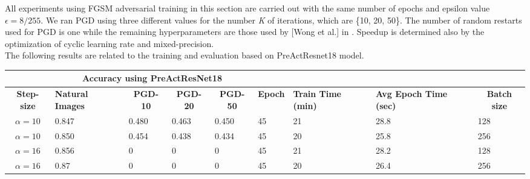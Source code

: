 \documentclass{article}
\begin{document}
All experiments using FGSM adversarial training in this section are carried out
with the same number of epochs and epsilon value $\epsilon = 8/255$. We ran PGD using three different values for the number \textit{K} of iterations,
which are \{10, 20, 50\}. The number of random restarts used for PGD is one
while the remaining hyperparameters are those used by [Wong et al.]
in \cite{WongEtAl2020}. Speedup is determined also by the optimization of cyclic learning rate and
mixed-precision.\\
The following results are related to the training and evaluation based on PreActResnet18 model. 
\begin{center}
\begin{table}[hbt!]
\begin{tabular}{|c|l|l|l|l|l|l|l|l|}
\hline
\multicolumn{1}{|l|}{{ }} & \multicolumn{4}{c|}{{ \textbf{Accuracy using
PreActResNet18}}}
& \multicolumn{4}{l|}{{ }}
\\ \hline
{ \textbf{Step-size}}     & \multicolumn{1}{p{1.5cm}|}{{ \textbf{Natural
Images}}} & \multicolumn{1}{c|}{{ \textbf{PGD-10}}} & \multicolumn{1}{c|}{{
\textbf{PGD-20}}} & \multicolumn{1}{c|}{{ \textbf{PGD-50}}} &
\multicolumn{1}{c|}{{ \textbf{Epoch}}} & \multicolumn{1}{p{1.5cm}|}{{
\textbf{Train Time (min)}}} & \multicolumn{1}{p{1.5cm}|}{{ \textbf{Avg Epoch
Time (sec)}}} & \multicolumn{1}{c|}{{ \textbf{Batch size}}} \\ \hline
{ $\alpha = 10$}       & { 0.847}                                        & {
0.480}                                & { 0.463}
& { 0.450}                                & { 45}
& { 21 }                               & { 28.8 }
& { 128}                                      \\ \hline
{ $\alpha = 10$}       & { 0.850}                                        & {
0.454}                                & { 0.438}
& { 0.434}                                & { 45}
& { 20 }                               & { 25.8 }
& { 256}                                      \\ \hline
{ $\alpha = 16$}       & { 0.856}                                        & { 0}
& { 0}                                    & { 0}
& { 45}                                  & { 21 }
& { 28.2 }                                 & { 128}
\\ \hline
{ $\alpha = 16$}       & { 0.87}                                         & { 0}
& { 0}                                    & { 0}
& { 45}                                  & { 20 }
& { 26.4 }                                 & { 256}
\\ \hline
\end{tabular}
\end{table}
\end{center}
\end{document}
